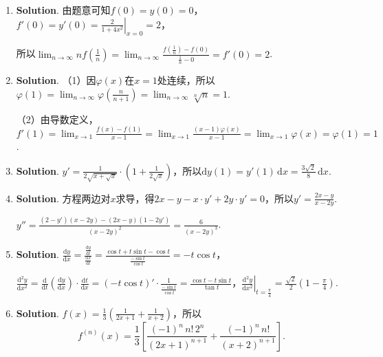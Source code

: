 \documentclass[../Main.tex]{subfiles}
\begin{document}
\begin{enumerate}
    \item \textbf{Solution}. 由题意可知$f(0)=y(0)=0$，$f'(0)=y'(0)=\left.\frac{2}{1+4x^{2}}
              \right|_{x=0}=2$，

          所以$\lim_{n\to\infty}nf\left(\frac{1}{n}\right)=\lim_{n\to\infty}\frac{f\left(\frac{1}{n}\right)-f(0)}{\frac{1}{n}-0}
              =f'(0)=2$.

    \item \textbf{Solution}. （1）因$\varphi(x)$在$x=1$处连续，所以$\varphi(1)=\lim
              _{n\to\infty}\varphi\left(\frac{n}{n+1}\right)=\lim_{n\to\infty}\sqrt[n]{n}
              =1$.

          （2）由导数定义，$f'(1)=\lim_{x\to1}\frac{f(x)-f(1)}{x-1}=\lim_{x\to1}\frac{(x-1)\varphi(x)}{x-1}
              =\lim_{x\to1}\varphi(x)=\varphi(1)=1$.

    \item \textbf{Solution}. $y'=\frac{1}{2\sqrt{x+\sqrt{x}}}\cdot\left(1+\frac{1}{2\sqrt{x}}
              \right)$，所以$\mathrm{d}y(1)=y'(1)\,\mathrm{d}x=\frac{3\sqrt{2}}{8}\,\mathrm{d}
              x$.

    \item \textbf{Solution}. 方程两边对$x$求导，得$2x-y-x\cdot y'+2y\cdot y'=0$，所以$y
              '=\frac{2x-y}{x-2y}$.

          $y''=\frac{(2-y')(x-2y)-(2x-y)(1-2y')}{(x-2y)^{2}}=\frac{6}{(x-2y)^{3}}$.

    \item \textbf{Solution}. $\frac{\mathrm{d}y}{\mathrm{d}x}=\frac{\frac{\mathrm{d}y}{\mathrm{d}t}}{\frac{\mathrm{d}x}{\mathrm{d}t}}
              =\frac{\cos t+t\sin t-\cos t}{\frac{-\sin t}{\cos t}}=-t\cos t$，

          $\frac{\mathrm{d}^{2}y}{\mathrm{d}x^{2}}=\frac{\mathrm{d}}{\mathrm{d}t}\left
              (\frac{\mathrm{d}y}{\mathrm{d}x}\right)\cdot\frac{\mathrm{d}t}{\mathrm{d}x}
              =\left(-t\cos t\right)'\cdot\frac{1}{\frac{-\sin t}{\cos t}}=\frac{\cos t- t\sin
                  t}{\tan t}$，$\left.\frac{\mathrm{d}^{2} y}{\mathrm{d}x^{2}}\right|_{t=\frac{\pi}{4}}
              =\frac{\sqrt{2}}{2}\left(1-\frac{\pi}{4}\right)$.

    \item \textbf{Solution}. $f(x)=\frac{1}{3}\left(\frac{1}{2x+1}+\frac{1}{x+2}\right
              )$，所以
          \[
              f^{(n)}(x)=\frac{1}{3}\left[\frac{(-1)^{n}\,n!\,2^{n}}{(2x+1)^{n+1}}+\frac{(-1)^{n}\,n!}{(x+2)^{n+1}}
                  \right].
          \]


\end{enumerate}
\end{document}
